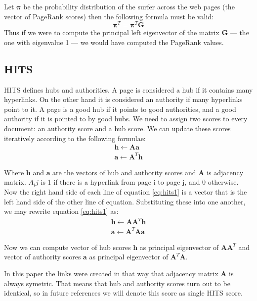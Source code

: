 \documentclass[10pt, a4paper]{article}
\begin{document}
Let $\boldsymbol{\pi}$ be the probability distribution of the surfer across the web pages (the vector of PageRank scores) then the following formula must be valid:
$$
\boldsymbol{\pi}^T = \boldsymbol{\pi}^T \mathbf{G}
$$
Thus if we were to compute the principal left eigenvector of the matrix \textbf{G} — the one with eigenvalue 1 — we would have computed the PageRank values.

\subsection{HITS}
HITS defines hubs and authorities. A page is considered a hub if it contains many hyperlinks. On the other hand it is considered an authority if many hyperlinks point to it. A page is a good hub if it points to good authorities, and a good authority if it is pointed to by good hubs. We need to assign two scores to every document: an authority score and a hub score. We can update these scores iteratively according to the following formulae:
\begin{equation}
  \label {eq:hits1}
\begin{gathered} 
\mathbf{h} \leftarrow \mathbf{A}\mathbf{a} \\
\mathbf{a} \leftarrow \mathbf{A}^T\mathbf{h} 
\end{gathered}
\end{equation}

Where $\mathbf{h}$ and $\mathbf{a}$ are the vectors of hub and authority scores and $\mathbf{A}$ is adjacency matrix. $A_ij$ 
is 1 if there is a hyperlink from page i to page j, and 0 otherwise.
Now the right hand side of each line of equation \ref{eq:hits1} is a vector that is the left hand side of the other line of equation.
Substituting these into one another, we may rewrite equation \ref{eq:hits1} as:
\begin{equation}
  \label {eq:hits2}
\begin{gathered} 
\mathbf{h} \leftarrow \mathbf{A}\mathbf{A}^T\mathbf{h} \\
\mathbf{a} \leftarrow \mathbf{A}^T\mathbf{A}\mathbf{a} 
\end{gathered}
\end{equation}

Now we can compute vector of hub scores $\mathbf{h}$ as principal eigenvector of $\mathbf{A}\mathbf{A}^T$ and vector of authority
scores $\mathbf{a}$ as principal
eigenvector of $\mathbf{A}^T\mathbf{A}$.

In this paper the links were created in that way that adjacency matrix $\mathbf{A}$ is always symetric. That means that hub and authority scores
turn out to be identical, so in future references we will denote this score as single HITS score.
\end{document}
